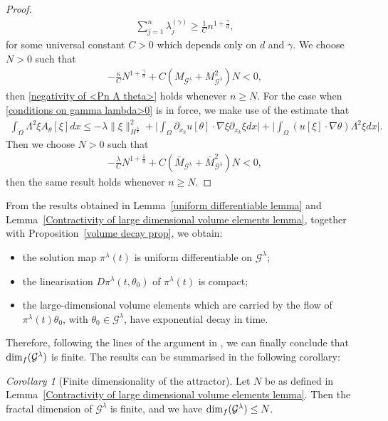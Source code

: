 \documentclass[reqno]{amsart}%
\theoremstyle{definition}
\theoremstyle{remark}
\numberwithin{equation}{section}
\newtheorem{corollary}[theorem]{Corollary}
\newcommand{\1}{\mathbf{1}}
\newcommand{\dimf}{\text{\rm dim}_{f}}
\newcommand{\Gg}{\mathcal{G}^{\lambda}}
\newcommand{\pin}{\pi^{\lambda}}
\newcommand{\intox}{\int_{\Omega}}
\numberwithin{equation}{section}
\numberwithin{theorem}{section}
\numberwithin{figure}{section}
\begin{document}
\begin{proof}
\begin{align*}
\sum_{j=1}^n\lambda_{j}^{(\gamma)}\ge\frac{1}{C}n^{1+\frac{\gamma}{d}},
\end{align*}
for some universal constant $C>0$ which depends only on $d$ and $\gamma$. We choose $N>0$ such that
\begin{align}\label{choice of N}
 -\frac{\kappa}{C}N^{1+\frac{\gamma}{d}}+C(M_{\Gg}+M_{\Gg}^2)N<0,
\end{align}
then \eqref{negativity of <Pn A theta>} holds whenever $n\ge N$. For the case when \eqref{conditions on gamma lambda>0} is in force, we make use of the estimate that
\begin{align*}
\intox\Lambda^2\xi A_{\theta}[\xi]dx\le-\lambda\|\xi\|^2_{H^{\frac{3}{2}}}+\Big|\intox\partial_{x_k}u[\theta]\cdot\nabla\xi\partial_{x_k}\xi dx\Big|+\Big|\intox(u[\xi]\cdot\nabla\theta)\Lambda^2\xi dx\Big|. 
\end{align*}
Then we choose $N>0$ such that
\begin{align}\label{choice of N lambda>0}
 -\frac{\lambda}{C}N^{1+\frac{1}{d}}+C(\bar{M}_{\Gg}+\bar{M}_{\Gg}^2)N<0,
\end{align}
then the same result holds whenever $n\ge N$.
\end{proof}

From the results obtained in Lemma~\ref{uniform differentiable lemma} and Lemma~\ref{Contractivity of large dimensional volume elements lemma}, together with Proposition~\ref{volume decay prop}, we obtain:
\begin{itemize}
\item the solution map $\pin(t)$ is uniform differentiable on $\Gg$;
\item the linearisation $D\pin(t, \theta_0)$ of $\pin(t)$ is compact;
\item the large-dimensional volume elements which are carried by the flow of $\pin(t)\theta_0$, with $\theta_0\in\Gg$, have exponential decay in time.
\end{itemize}
Therefore, following the lines of the argument in \cite[pp. 115--130, and Chapter 14]{CF88}, we can finally conclude that $\dimf(\Gg)$ is finite. The results can be summarised in the following corollary:

\begin{corollary}[Finite dimensionality of the attractor]\label{Finite dimensionality of the attractor corollary}
Let $N$ be as defined in Lemma~\ref{Contractivity of large dimensional volume elements lemma}. Then the fractal dimension of $\Gg$ is finite, and we have $\dimf(\Gg)\le N$.
\end{corollary}
\end{document}
